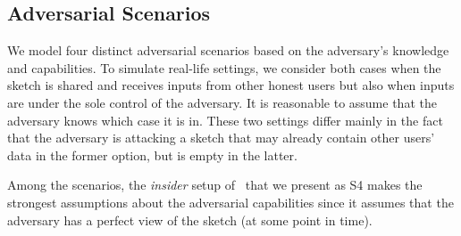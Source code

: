 \documentclass{article}
\begin{document}
\subsection{Adversarial Scenarios}\label{sec:set}
We model four distinct adversarial scenarios based on the adversary's knowledge and capabilities. To simulate real-life settings, we consider both cases when the sketch is shared and receives inputs from other honest users but also when inputs are under the sole control of the adversary.
It is reasonable to assume that the adversary knows which case it is in. 
These two settings differ mainly in the fact that the adversary is attacking a sketch that may already contain other users' data in the former option, but is empty in the latter.

Among the scenarios, the \textit{insider} setup of~\cite{cardestprivacy} that we present as S4 makes the strongest assumptions about the adversarial capabilities since it assumes that the adversary has a perfect view of the sketch (at some point in time).
\end{document}
